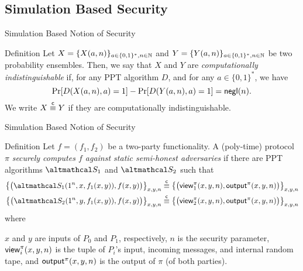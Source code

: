 \documentclass[../250326_cryptlab_flute_security.tex]{subfiles}
\begin{document}
\subsection{Simulation Based Security}

\begin{frame}{Simulation Based Notion of Security}
    \begin{block}{Definition}
        Let \(X = \{X(a,n)\}_{a \in \{0,1\}^\ast, n \in \mathbb{N}}\) and \(Y = \{Y(a,n)\}_{a \in \{0,1\}^\ast, n \in \mathbb{N}}\)
        be two probability ensembles. Then, we say that \(X\) and \(Y\) are \emph{computationally}
        \emph{indistinguishable} if, for any PPT algorithm \(D\), and for any \(a \in \{0,1\}^\ast\),
        we have
        \[
            \Pr[D(X(a, n), a) = 1] - \Pr[D(Y(a, n), a) = 1] = \mathsf{negl}(n)\text.
        \]
        We write \(X \overset{\mathsf{c}}{\equiv} Y\) if they are computationally indistinguishable.
    \end{block}
\end{frame}

\begin{frame}{Simulation Based Notion of Security}
    \begin{block}{Definition}
        Let \(f = (f_1, f_2)\) be a two-party functionality.
        A (poly-time) protocol \(\pi\) \emph{securely computes \(f\) against static
        semi-honest adversaries} if there are PPT algorithms \(\mcal{S}_1\) and \(\mcal{S}_2\) such that
        \footnotesize
        \begin{align*}
            \bigl\{ \bigl( \mcal{S}_1(1^n, x, f_1(x, y)), f(x, y) \bigr) \bigr\}_{x,y,n}
            &\overset{\msf{c}}{\equiv}
            \bigl\{ \bigl( \msf{view}_1^\pi(x, y, n), \msf{output}^\pi(x, y, n) \bigr)
            \bigr\}_{x,y,n} \\
            \bigl\{ \bigl( \mcal{S}_2(1^n, y, f_1(x, y)), f(x, y) \bigr) \bigr\}_{x,y,n}
            &\overset{\msf{c}}{\equiv}
            \bigl\{ \bigl( \msf{view}_2^\pi(x, y, n), \msf{output}^\pi(x, y, n) \bigr)
            \bigr\}_{x,y,n}
        \end{align*}
        \small
        where
        \begin{itemize}
            \ii
            \(x\) and \(y\) are inputs of \(P_0\) and \(P_1\), respectively,
            \ii
            \(n\) is the security parameter,
            \ii
            \(\mathsf{view}_i^\pi(x, y, n)\)
            is the tuple of \(P_i\)'s input, incoming messages, and internal random tape, and
            \ii
            \(\mathsf{output}^\pi(x, y, n)\) is the output of \(\pi\) (of both parties).
        \end{itemize}
    \end{block}
\end{frame}
\end{document}
